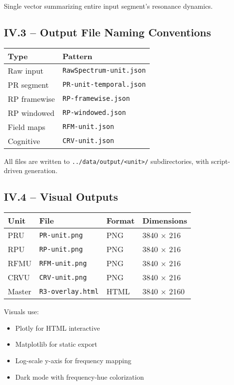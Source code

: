 Single vector summarizing entire input segment’s resonance dynamics.

\subsection*{IV.3 – Output File Naming Conventions}

\begin{center}
\begin{tabular}{|l|l|}
\hline
\textbf{Type} & \textbf{Pattern} \\
\hline
Raw input & \texttt{RawSpectrum-unit.json} \\
PR segment & \texttt{PR-unit-temporal.json} \\
RP framewise & \texttt{RP-framewise.json} \\
RP windowed & \texttt{RP-windowed.json} \\
Field maps & \texttt{RFM-unit.json} \\
Cognitive & \texttt{CRV-unit.json} \\
\hline
\end{tabular}
\end{center}

All files are written to \texttt{../data/output/<unit>/} subdirectories, with script-driven generation.

\subsection*{IV.4 – Visual Outputs}

\begin{center}
\begin{tabular}{|l|l|l|l|}
\hline
\textbf{Unit} & \textbf{File} & \textbf{Format} & \textbf{Dimensions} \\
\hline
PRU & \texttt{PR-unit.png} & PNG & 3840 × 216 \\
RPU & \texttt{RP-unit.png} & PNG & 3840 × 216 \\
RFMU & \texttt{RFM-unit.png} & PNG & 3840 × 216 \\
CRVU & \texttt{CRV-unit.png} & PNG & 3840 × 216 \\
Master & \texttt{R3-overlay.html} & HTML & 3840 × 2160 \\
\hline
\end{tabular}
\end{center}

Visuals use:

\begin{itemize}
    \item Plotly for HTML interactive
    \item Matplotlib for static export
    \item Log-scale y-axis for frequency mapping
    \item Dark mode with frequency-hue colorization
\end{itemize}

